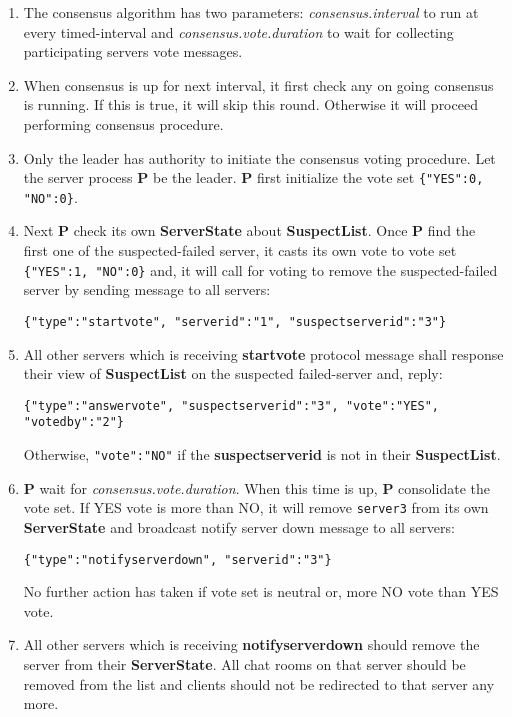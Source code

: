 \documentclass[dareport.tex]{subfiles}
\begin{document}
\begin{enumerate}[leftmargin=*]
\item The consensus algorithm has two parameters: \emph{consensus.interval} to run at every timed-interval and \emph{consensus.vote.duration} to wait for collecting participating servers vote messages.

\item When consensus is up for next interval, it first check any on going consensus is running. If this is true, it will skip this round. Otherwise it will proceed performing consensus procedure.

\item Only the leader has authority to initiate the consensus voting procedure. Let the server process \textbf{P} be the leader. \textbf{P} first initialize the vote set \verb|{"YES":0, "NO":0}|. 

\item Next \textbf{P} check its own \textbf{ServerState} about \textbf{SuspectList}. Once \textbf{P} find the first one of the suspected-failed server, it casts its own vote to vote set \verb|{"YES":1, "NO":0}| and, it will call for voting to remove the suspected-failed server by sending message to all servers:
\begin{small}
\begin{verbatim}
{"type":"startvote", "serverid":"1", "suspectserverid":"3"}
\end{verbatim}
\end{small}

\item All other servers which is receiving \textbf{startvote} protocol message shall response their view of \textbf{SuspectList} on the suspected failed-server and, reply:
\begin{small}
\begin{verbatim}
{"type":"answervote", "suspectserverid":"3", "vote":"YES", "votedby":"2"}
\end{verbatim}
\end{small}
Otherwise, \verb|"vote":"NO"| if the \textbf{suspectserverid} is not in their \textbf{SuspectList}.

\item \textbf{P} wait for \emph{consensus.vote.duration}. When this time is up, \textbf{P} consolidate the vote set. If YES vote is more than NO, it will remove \verb|server3| from its own \textbf{ServerState} and broadcast notify server down message to all servers:
\begin{small}
\begin{verbatim}
{"type":"notifyserverdown", "serverid":"3"}
\end{verbatim}
\end{small}
No further action has taken if vote set is neutral or, more NO vote than YES vote.

\item All other servers which is receiving \textbf{notifyserverdown} should remove the server from their \textbf{ServerState}. All chat rooms on that server should be removed from the list and clients should not be redirected to that server any more.

\end{enumerate}
\end{document}
